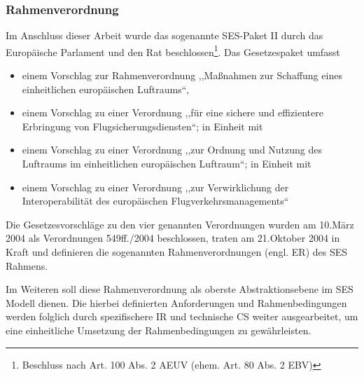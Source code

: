 \pagebreak
\subsubsection{Rahmenverordnung}

Im Anschluss dieser Arbeit wurde das sogenannte \acs{SES}-Paket II durch das Europäische Parlament und den Rat beschlossen\footnote{Beschluss nach Art. 100 Abs. 2 AEUV (ehem. Art. 80 Abs. 2 EBV)}.
Das Gesetzespaket umfasst 

\begin{itemize}
    \item einem Vorschlag zur Rahmenverordnung ,,Maßnahmen zur Schaffung eines einheitlichen europäischen Luftraums``\cite{kom_01_564, kom_01_123},
    \item einem Vorschlag zu einer Verordnung ,,für eine sichere und effizientere Erbringung von Flugsicherungsdiensten``\cite{kom_01_564_1}; in Einheit mit
    \item  einem Vorschlag zu einer Verordnung ,,zur Ordnung und Nutzung des Luftraums im einheitlichen europäischen Luftraum``\cite{kom_01_564_2}; in Einheit mit
    \item  einem Vorschlag zu einer Verordnung ,,zur Verwirklichung der Interoperabilität des europäischen Flugverkehrsmanagements``\cite{kom_01_564_3}
\end{itemize}

Die Gesetzesvorschläge zu den vier genannten Verordnungen wurden am 10.März 2004 als Verordnungen 549ff./2004 beschlossen, traten am 21.Oktober 2004 in Kraft \cite[S.12]{eu_ses_studie} und definieren die sogenannten Rahmenverordnungen (engl. \acf{ER}) des \ac{SES} Rahmens.

Im Weiteren soll diese Rahmenverordnung als oberste Abstraktionsebene im \ac{SES} Modell dienen. 
Die hierbei definierten Anforderungen und Rahmenbedingungen werden folglich durch spezifischere \acf{IR} und technische \acf{CS} weiter ausgearbeitet, um eine einheitliche Umsetzung der Rahmenbedingungen zu gewährleisten.




